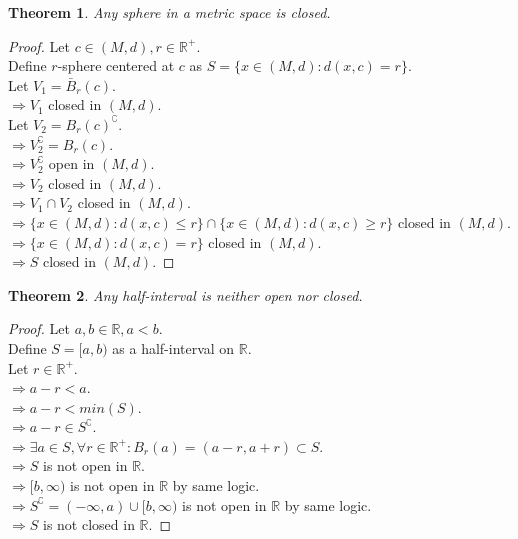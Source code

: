 \documentclass{article}
\newtheorem{theorem}{Theorem}[section]
\begin{document}
			\begin{theorem}
				Any sphere in a metric space is closed.
			\end{theorem}
			\begin{proof} 
				Let $c \in (M, d), r \in \mathbb{R}^+$. \\
				Define $r$-sphere centered at $c$ as $S = \{x \in (M, d): d(x, c) = r \}$. \\
				Let $V_1 = \bar{B}_{r}(c)$. \\
				$\Rightarrow V_1$ closed in $(M, d)$. \\
				Let $V_2 = B_{r}(c)^\complement$. \\
				$\Rightarrow V_2^\complement = B_{r}(c)$. \\
				$\Rightarrow V_2^\complement$ open in $(M, d)$. \\
				$\Rightarrow V_2$ closed in $(M, d)$. \\
				$\Rightarrow V_1 \cap V_2$ closed in $(M, d)$. \\
				$\Rightarrow \{x \in (M, d): d(x, c) \leq r \} \cap \{x \in (M, d): d(x, c) \geq r \}$ closed in $(M, d)$. \\
				$\Rightarrow \{x \in (M, d): d(x, c) = r \}$ closed in $(M, d)$. \\
				$\Rightarrow S$ closed in $(M, d)$.
			\end{proof}
			\begin{theorem}
				Any half-interval is neither open nor closed.
			\end{theorem}
			\begin{proof} 
				Let $a, b \in \mathbb{R}, a < b$. \\
				Define $S = [a, b)$ as a half-interval on $\mathbb{R}$. \\
				Let $r \in \mathbb{R}^+$. \\
				$\Rightarrow a - r < a$. \\
				$\Rightarrow a - r < min(S)$. \\
				$\Rightarrow a - r \in S^\complement$. \\
				$\Rightarrow \exists a \in S, \forall r \in \mathbb{R}^{+}: B_{r}(a) = (a - r, a + r) \subset S$. \\
				$\Rightarrow S$ is not open in $\mathbb{R}$. \\
				$\Rightarrow [b, \infty)$ is not open in $\mathbb{R}$ by same logic.\\
				$\Rightarrow S^\complement = (-\infty, a) \cup [b, \infty)$ is not open in $\mathbb{R}$ by same logic.\\
				$\Rightarrow S$ is not closed in $\mathbb{R}$.
			\end{proof}
\end{document}
